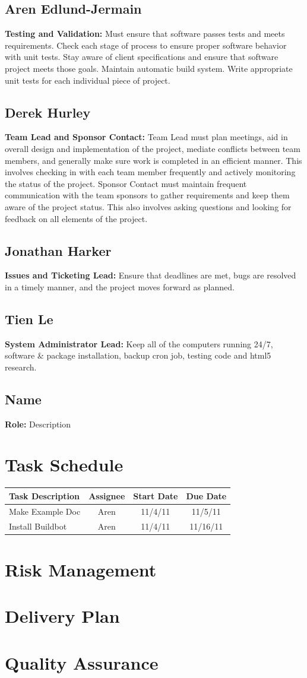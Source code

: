 \documentclass[12pt, letterpaper]{article}
\begin{document}
  \subsection{Aren Edlund-Jermain}
  {\bf Testing and Validation:} Must ensure that software passes tests and meets requirements. Check each stage of process to ensure proper software behavior with unit tests. Stay aware of client specifications and ensure that software project meets those goals. Maintain automatic build system. Write appropriate unit tests for each individual piece of project.
  \subsection{Derek Hurley}
  {\bf Team Lead and Sponsor Contact:} Team Lead must plan meetings, aid in overall design and implementation of the project, mediate conflicts between team members, and generally make sure work is completed in an efficient manner. This involves checking in with each team member frequently and actively monitoring the status of the project. Sponsor Contact must maintain frequent communication with the team sponsors to gather requirements and keep them aware of the project status. This also involves asking questions and looking for feedback on all elements of the project.
  \subsection{Jonathan Harker}
  {\bf Issues and Ticketing Lead:} Ensure that deadlines are met, bugs are resolved in a timely manner, and the project moves forward as planned.
  \subsection{Tien Le}
  {\bf System Administrator Lead:} Keep all of the computers running 24/7, software & package installation, backup cron job, testing code and html5 research. 
  \subsection{Name}
  {\bf Role:} Description

\section{Task Schedule}

\begin{center}
  \begin{tabular}{l || c | c | c | }
    Task Description & Assignee & Start Date & Due Date \\
    \hline
    Make Example Doc & Aren & 11/4/11 & 11/5/11 \\
    Install Buildbot & Aren & 11/4/11 & 11/16/11 \\
    \hline
  \end{tabular}
\end{center}

\section{Risk Management}

\section{Delivery Plan}

\section{Quality Assurance}
\end{document}
